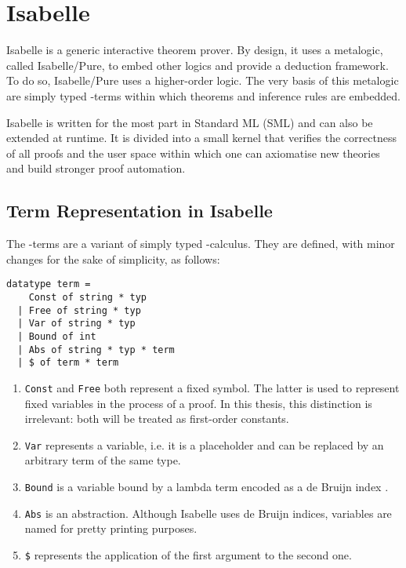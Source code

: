 \section{Isabelle}
Isabelle is a generic interactive theorem prover. By design, it uses a metalogic, called Isabelle/Pure, to embed other logics and provide a deduction framework. To do so, Isabelle/Pure uses a higher-order logic. The very basis of this metalogic are simply typed \lam -terms within which theorems and inference rules are embedded. \cite{wenzel_isabelleisar_2021}

Isabelle is written for the most part in Standard ML (SML) and can also be extended at runtime. It is divided into a small kernel that verifies the correctness of all proofs and the user space within which one can axiomatise new theories and build stronger proof automation.

\subsection{Term Representation in Isabelle}
The \lam -terms are a variant of simply typed \lam -calculus. They are defined, with minor changes for the sake of simplicity, as follows:
\begin{lstlisting}
datatype term =
    Const of string * typ
  | Free of string * typ
  | Var of string * typ
  | Bound of int
  | Abs of string * typ * term
  | $ of term * term
\end{lstlisting} %
\vspace{-12pt}
\begin{enumerate}
  \item \lstinline{Const} and \lstinline{Free} both represent a fixed symbol. The latter is used to represent fixed variables in the process of a proof. In this thesis, this distinction is irrelevant: both will be treated as first-order constants.
  \item \lstinline{Var} represents a variable, i.e. it is a placeholder and can be replaced by an arbitrary term of the same type.
  \item \lstinline{Bound} is a variable bound by a lambda term encoded as a de Bruijn index \cite{bruijn_lambda_nodate}.
  \item \lstinline{Abs} is an abstraction. Although Isabelle uses de Bruijn indices, variables are named for pretty printing purposes.
  \item \lstinline{$} represents the application of the first argument to the second one.
\end{enumerate} %

